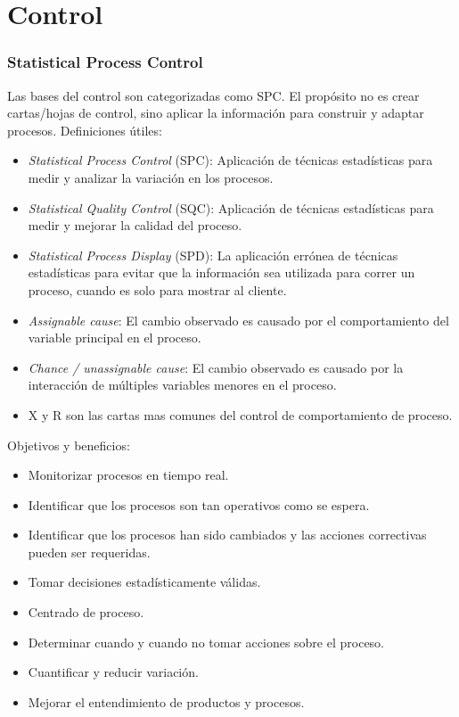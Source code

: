 \documentclass[]{article}
\begin{document}
\part{Control}
\section{Statistical Process Control}

Las bases del control son categorizadas como SPC. El propósito no es crear cartas/hojas de control, sino aplicar la información para construir y adaptar procesos.
Definiciones útiles:
\begin{itemize}
	\item \textit{Statistical Process Control} (SPC): Aplicación de técnicas estadísticas para medir y analizar la variación en los procesos.
	\item \textit{Statistical Quality Control} (SQC): Aplicación de técnicas estadísticas para medir y mejorar la calidad del proceso.
	\item \textit{Statistical Process Display} (SPD): La aplicación errónea de técnicas estadísticas para evitar que la información sea utilizada para correr un proceso, cuando es solo para mostrar al cliente. 
	\item \textit{Assignable cause}: El cambio observado es causado por el comportamiento del variable principal en el proceso.
	\item \textit{Chance / unassignable cause}: El cambio observado es causado por la interacción de múltiples variables menores en el proceso.
	\item X y R son las cartas mas comunes del control de comportamiento de proceso.
\end{itemize}
Objetivos y beneficios:
\begin{itemize}
	\item Monitorizar procesos en tiempo real.
	\item Identificar que los procesos son tan operativos como se espera.
	\item Identificar que los procesos han sido cambiados y las acciones correctivas pueden ser requeridas.
	\item Tomar decisiones estadísticamente válidas.
	\item Centrado de proceso.
	\item Determinar cuando y cuando no tomar acciones sobre el proceso.
	\item Cuantificar y reducir variación.
	\item Mejorar el entendimiento de productos y procesos.
\end{itemize}
\end{document}
